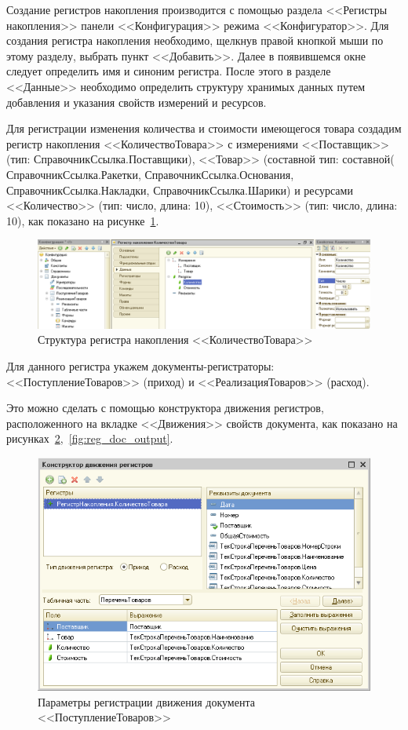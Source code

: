 Создание регистров накопления производится с помощью раздела
<<Регистры накопления>> панели <<Конфигурация>> режима <<Конфигуратор>>.
Для создания регистра накопления необходимо,
щелкнув правой кнопкой мыши по этому
разделу, выбрать пункт <<Добавить>>. Далее в появившемся окне
следует определить имя и синоним регистра.
После этого в разделе <<Данные>> необходимо определить структуру
хранимых данных путем добавления и указания свойств измерений и ресурсов.

Для регистрации изменения количества и стоимости имеющегося товара
создадим регистр накопления <<КоличествоТовара>> с измерениями
<<Поставщик>> (тип: СправочникСсылка.Поставщики),
<<Товар>> (составной тип: составной(%
  СправочникСсылка.Ракетки,
  СправочникСсылка.Основания,
  СправочникСсылка.Накладки,
  СправочникСсылка.Шарики)
и ресурсами
<<Количество>> (тип: число, длина: 10),
<<Стоимость>> (тип: число, длина: 10),
как показано на рисунке~\ref{fig:reg_structure}.

\begin{figure}[h!]
  \centering
  \includegraphics[width=150mm]{pic/reg_structure}
  \caption{Структура регистра накопления <<КоличествоТовара>>}
  \label{fig:reg_structure}
\end{figure}

Для данного регистра укажем документы-регистраторы:
<<ПоступлениеТоваров>> (приход) и
<<РеализацияТоваров>> (расход).

Это можно сделать с помощью конструктора движения регистров,
расположенного на вкладке <<Движения>> свойств документа,
как показано на рисунках~\ref{fig:reg_doc_input},~\ref{fig:reg_doc_output}.

\begin{figure}[h!]
  \centering
  \includegraphics[width=130mm]{pic/reg_doc_input}
  \caption{Параметры регистрации движения документа <<ПоступлениеТоваров>>}
  \label{fig:reg_doc_input}
\end{figure}

